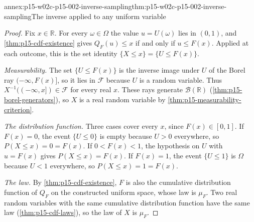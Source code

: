 \begin{annexitem}{annex:p15-w02c-p15-002-inverse-sampling}{thm:p15-w02c-p15-002-inverse-sampling}{The inverse applied to any uniform variable}
\begin{proof}
Fix \(x\in\mathbb R\). For every \(\omega\in\Omega\) the value
\(u=U(\omega)\) lies in \((0,1)\), and \cref{thm:p15-cdf-existence} gives
\(Q_F(u)\leq x\) if and only if \(u\leq F(x)\). Applied at each outcome,
this is the set identity \(\{X\leq x\}=\{U\leq F(x)\}\).

\emph{Measurability.} The set \(\{U\leq F(x)\}\) is the inverse image under
\(U\) of the Borel ray \((-\infty,F(x)]\), so it lies in \(\mathcal F\)
because \(U\) is a random variable. Thus \(X^{-1}((-\infty,x])\in\mathcal F\)
for every real \(x\). These rays generate \(\mathcal B(\mathbb R)\)
(\cref{thm:p15-borel-generators}), so \(X\) is a real random variable by
\cref{thm:p15-measurability-criterion}.

\emph{The distribution function.} Three cases cover every \(x\), since
\(F(x)\in[0,1]\). If \(F(x)=0\), the event \(\{U\leq0\}\) is empty because
\(U>0\) everywhere, so \(P(X\leq x)=0=F(x)\). If \(0<F(x)<1\), the
hypothesis on \(U\) with \(u=F(x)\) gives \(P(X\leq x)=F(x)\). If
\(F(x)=1\), the event \(\{U\leq1\}\) is \(\Omega\) because \(U<1\)
everywhere, so \(P(X\leq x)=1=F(x)\).

\emph{The law.} By \cref{thm:p15-cdf-existence}, \(F\) is also the
cumulative distribution function of \(Q_F\) on the constructed uniform
space, whose law is \(\mu_F\). Two real random variables with the same
cumulative distribution function have the same law
(\cref{thm:p15-cdf-laws}), so the law of \(X\) is \(\mu_F\).
\end{proof}
\end{annexitem}

